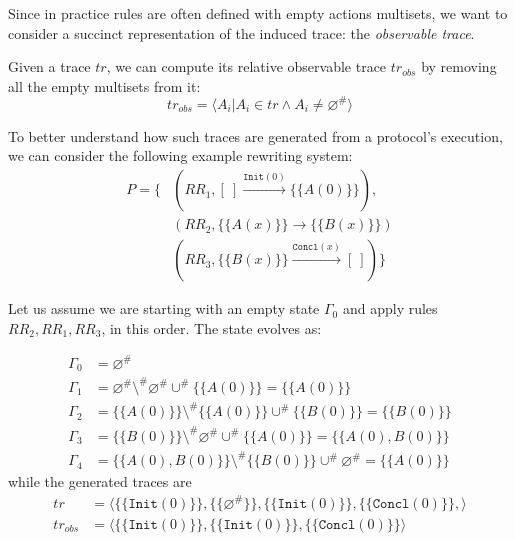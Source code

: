Since in practice rules are often defined with empty actions multisets, we want to consider a succinct representation of the induced trace: the \textit{observable trace}. 

\begin{definition}
    Given a trace $tr$, we can compute its relative observable trace $tr_{obs}$ by removing all the empty multisets from it:
    \begin{equation*}
        tr_{obs} = \langle A_i | A_i \in tr \land A_i \neq \varnothing^{\#} \rangle
    \end{equation*}
\end{definition}

To better understand how such traces are generated from a protocol's execution, we can consider the following example rewriting system:
\begin{align*}
    P = \{ &(RR_1, [ \ ] \xrightarrow{\texttt{Init}(0)} \{\{A(0)\}\}),\\
    &(RR_2, \{\{A(x)\}\} \to \{\{B(x)\}\})\\
    &(RR_3, \{\{B(x)\}\} \xrightarrow{\texttt{Concl}(x)} [ \ ])\}
\end{align*}

Let us assume we are starting with an empty state $\Gamma_0$ and apply rules $RR_2, RR_1, RR_3$, in this order. The state evolves as:

\begin{align*}
    \Gamma_0 &= \varnothing^{\#}\\
    \Gamma_1 &= \varnothing^{\#} \setminus^{\#} \varnothing^{\#} \cup^{\#} \{\{A(0)\}\} = \{\{A(0)\}\}\\
    \Gamma_2 &= \{\{A(0)\}\} \setminus^{\#} \{\{A(0)\}\} \cup^{\#} \{\{B(0)\}\} = \{\{B(0)\}\}\\
    \Gamma_3 &= \{\{B(0)\}\} \setminus^{\#} \varnothing^{\#} \cup^{\#} \{\{A(0)\}\} = \{\{A(0), B(0)\}\}\\
    \Gamma_4 &= \{\{A(0), B(0)\}\} \setminus^{\#} \{\{B(0)\}\} \cup^{\#} \varnothing^{\#} = \{\{A(0)\}\}
\end{align*}
while the generated traces are
\begin{align*}
    tr &= \langle \{\{\texttt{Init}(0)\}\}, \{\{\varnothing^{\#}\}\}, \{\{\texttt{Init}(0)\}\}, \{\{\texttt{Concl}(0)\}\},\rangle\\
    tr_{obs} &= \langle \{\{\texttt{Init}(0)\}\}, \{\{\texttt{Init}(0)\}\}, \{\{\texttt{Concl}(0)\}\}\rangle
\end{align*}

